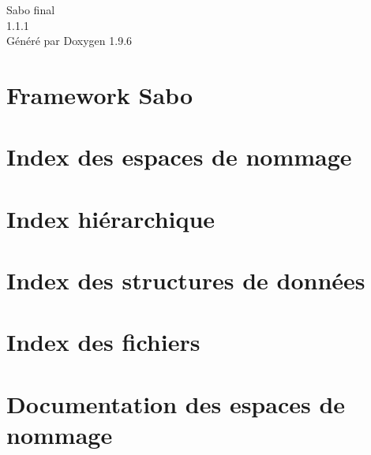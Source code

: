 \documentclass[twoside]{book}
\newcommand{\+}{\discretionary{\mbox{\scriptsize$\hookleftarrow$}}{}{}}
\newcommand{\clearemptydoublepage}{%
    \newpage{\pagestyle{empty}\cleardoublepage}%
  }
\begin{document}
  \raggedbottom
    \hypersetup{pageanchor=false,
                bookmarksnumbered=true,
                pdfencoding=unicode
               }
  \begin{titlepage}
  \vspace*{7cm}
  \begin{center}%
  {\Large Sabo final}\\
  [1ex]\large 1.\+1.\+1 \\
  \vspace*{1cm}
  {\large Généré par Doxygen 1.9.6}\\
  \end{center}
  \end{titlepage}
  \clearemptydoublepage
  \tableofcontents
  \clearemptydoublepage
  \hypersetup{pageanchor=true}
\chapter{Framework Sabo}
\label{a01125}

\chapter{Index des espaces de nommage}

\chapter{Index hiérarchique}

\chapter{Index des structures de données}

\chapter{Index des fichiers}

\chapter{Documentation des espaces de nommage}


































\end{document}
